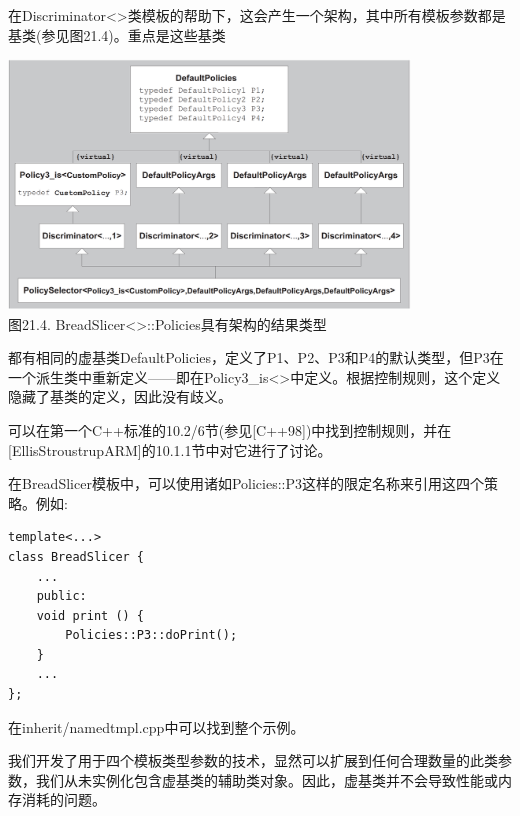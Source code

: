 在Discriminator<>类模板的帮助下，这会产生一个架构，其中所有模板参数都是基类(参见图21.4)。重点是这些基类

\begin{center}
\includegraphics[width=0.8\textwidth]{content/3/chapter21/images/4.png} \\
图21.4. BreadSlicer<>::Policies具有架构的结果类型
\end{center}

都有相同的虚基类DefaultPolicies，定义了P1、P2、P3和P4的默认类型，但P3在一个派生类中重新定义——即在Policy3\_is<>中定义。根据控制规则，这个定义隐藏了基类的定义，因此没有歧义。

\begin{tcolorbox}[colback=webgreen!5!white,colframe=webgreen!75!black]
\hspace*{0.75cm}可以在第一个C++标准的10.2/6节(参见[C++98])中找到控制规则，并在[EllisStroustrupARM]的10.1.1节中对它进行了讨论。
\end{tcolorbox}

在BreadSlicer模板中，可以使用诸如Policies::P3这样的限定名称来引用这四个策略。例如:

\begin{lstlisting}[style=styleCXX]
template<...>
class BreadSlicer {
	...
	public:
	void print () {
		Policies::P3::doPrint();
	}
	...
};
\end{lstlisting}

在inherit/namedtmpl.cpp中可以找到整个示例。

我们开发了用于四个模板类型参数的技术，显然可以扩展到任何合理数量的此类参数，我们从未实例化包含虚基类的辅助类对象。因此，虚基类并不会导致性能或内存消耗的问题。






